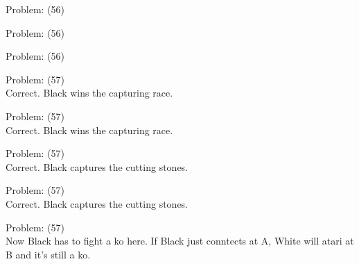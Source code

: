 \documentclass[11pt]{article}
\begin{document}
\begin{minipage}[t]{0.5\textwidth}
  {\centering
  
Problem: (56)\\
  }
\end{minipage}
\begin{minipage}[t]{0.5\textwidth}
  {\centering
  
Problem: (56)\\
  }
\end{minipage}
\begin{minipage}[t]{0.5\textwidth}
  {\centering
  
Problem: (56)\\
  }
\end{minipage}
\begin{minipage}[t]{0.5\textwidth}
  {\centering
  
Problem: (57)\\
Correct. Black wins the capturing race.\\
  }
\end{minipage}
\begin{minipage}[t]{0.5\textwidth}
  {\centering
  
Problem: (57)\\
Correct. Black wins the capturing race.\\
  }
\end{minipage}
\begin{minipage}[t]{0.5\textwidth}
  {\centering
  
Problem: (57)\\
Correct. Black captures the cutting stones.\\
  }
\end{minipage}
\begin{minipage}[t]{0.5\textwidth}
  {\centering
  
Problem: (57)\\
Correct. Black captures the cutting stones.\\
  }
\end{minipage}
\begin{minipage}[t]{0.5\textwidth}
  {\centering
  
Problem: (57)\\
Now Black has to fight a ko here. If Black just conntects at A, White will atari at B and it's still a ko.\\
  }
\end{minipage}
\end{document}
